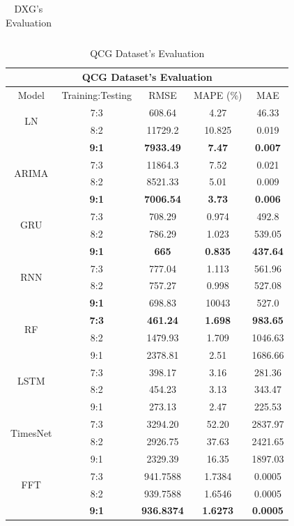 \documentclass{ieeeojies}
\begin{document}
\begin{table}[H]
\begin{tabular}{|ccccc|}
  \end{tabular}
  \caption{DXG's Evaluation}
    \label{vcbresult}
  \end{table}\begin{table}[H]
  \centering
  \begin{tabular}{|c|c|c|c|c|}
         \hline
         \multicolumn{5}{|c|}{\textbf{QCG Dataset's Evaluation}}\\
         \hline
         \centering Model & Training:Testing & RMSE & MAPE (\%) & MAE\\
         \hline
         \multirow{2}{*}{LN} & 7:3 & 608.64 & 4.27 & 46.33 \\ & 8:2 & 11729.2 & 10.825 & 0.019 \\ & \textbf{9:1} & \textbf{7933.49} & \textbf{7.47} & \textbf{0.007}\\
         \hline
         \multirow{2}{*}{ARIMA} & 7:3&11864.3&7.52&0.021\\ & 8:2&8521.33&5.01&0.009 \\ & \textbf{9:1} & \textbf{7006.54} & \textbf{3.73} & \textbf{0.006}\\
         \hline
         \multirow{2}{*}{GRU} & 7:3 & 708.29 & 0.974 & 492.8\\ & 8:2 & 786.29 & 1.023 & 539.05  \\ & \textbf{9:1} & \textbf{665}	& \textbf{0.835} &  \textbf{437.64} \\
         \hline
         \multirow{2}{*}{RNN} & 7:3 &  777.04 &  1.113 & 561.96 \\ & 8:2 &  757.27 & 0.998 &  527.08\\ & \textbf{9:1} & 698.83 & 10043 & 527.0\\
         \hline
         \multirow{2}{*}{RF} & \textbf{7:3}	& \textbf{461.24} & \textbf{1.698} & \textbf{983.65} \\ & 8:2 & 1479.93 & 1.709 & 1046.63 \\ & 9:1 & 2378.81 &  2.51 & 1686.66\\
         \hline
         \multirow{2}{*}{LSTM} & 7:3 & 398.17 & 3.16 & 281.36 \\ & 8:2 & 454.23 & 3.13 & 343.47 \\ & 9:1 & 273.13	&2.47&225.53\\
         \hline
         \multirow{2}{*}{TimesNet} & 7:3 & 3294.20 & 52.20 & 2837.97 \\ & 8:2 & 2926.75 & 37.63 & 2421.65 \\ & 9:1 & 2329.39	& 16.35 &1897.03\\
         \hline
         \multirow{2}{*}{FFT} & 7:3 & 941.7588 &  1.7384 &  0.0005 \\ & 8:2 & 939.7588 &  1.6546 &  0.0005 \\ & \textbf{9:1} & \textbf{936.8374} & \textbf{1.6273} & \textbf{0.0005}\\
         \hline
    \end{tabular}
    \caption{QCG Dataset's Evaluation}
    \label{vcbresult}
\end{table}
\end{document}
